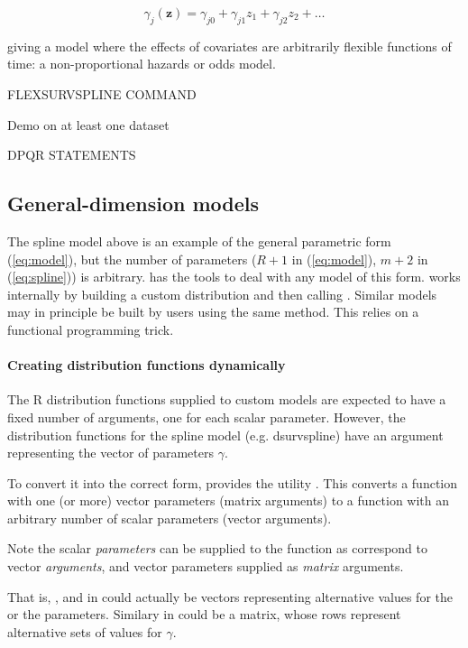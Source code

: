 \documentclass[nojss,nofooter]{jss}
\begin{document}
\[\gamma_j(\mathbf{z}) = \gamma_{j0} + \gamma_{j1}z_1 + \gamma_{j2}z_2 + \ldots\]

giving a model where the effects of covariates are arbitrarily flexible
functions of time: a non-proportional hazards or odds model.

FLEXSURVSPLINE COMMAND

Demo on at least one dataset 

DPQR STATEMENTS


\subsection{General-dimension models}
\label{sec:gdim}

The spline model above is an example of the general parametric form
(\ref{eq:model}), but the number of parameters ($R+1$ in
(\ref{eq:model}), $m+2$ in (\ref{eq:spline})) is arbitrary.
 has the tools to deal with any model of this form.
 works internally by building a custom
distribution and then calling .  Similar models may
in principle be built by users using the same method.  This relies on
a functional programming trick.

\paragraph{Creating distribution functions dynamically}

The R distribution functions supplied to custom models are expected to
have a fixed number of arguments, one for each scalar parameter.
However, the distribution functions for the spline model
(e.g. dsurvspline) have an argument  representing the
vector of parameters $\gamma$.  


To convert it into the correct form,  provides the
utility .  This converts a function with one (or
more) vector parameters (matrix arguments) to a function with an
arbitrary number of scalar parameters (vector arguments).

Note the scalar \emph{parameters} can be supplied to the function as
correspond to vector \emph{arguments}, and vector parameters supplied
as \emph{matrix} arguments.

That is, , and  in
 could actually be vectors representing
alternative values for the  or the parameters.  Similary
 in  could be a matrix,
  whose rows represent alternative sets of values for $\gamma$.
\end{document}
